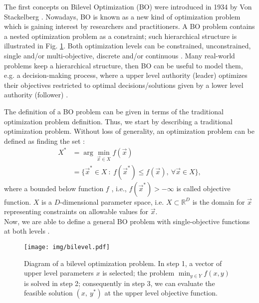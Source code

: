 \documentclass[conference]{IEEEtran}
\theoremstyle{definition}
\begin{document}
The first concepts on Bilevel Optimization (BO) were introduced in 1934 by Von
Stackelberg \cite{von2010market}. Nowadays, BO is known as a new kind of optimization
problem which is gaining interest by researchers and practitioners. A BO problem
contains a nested optimization problem as a constraint; such hierarchical structure
is illustrated in Fig. \ref{fig:bilevel}. Both optimization levels can be constrained,
unconstrained, single and/or multi-objective, discrete and/or continuous
\cite{bard2013practical,dempe2002foundations}. Many real-world problems keep a hierarchical
structure, then BO can be useful to model them, e.g. a decision-making process,
where a upper level authority (leader) optimizes their objectives restricted to
optimal decisions/solutions given by a  lower level authority (follower)
\cite{brotcorne2001bilevel,kalashnikov2010comparison,sinha2015transportation,von1945theory,wang2014bilevel}.

The definition of a BO problem can be given in terms of the traditional
optimization problem definition. Thus, we start by describing a traditional optimization
problem. Without loss of generality, an optimization problem can be defined as
finding the set \cite{chong2013introduction,rao2009engineering}:
% 
\begin{align}
    \label{eqn:Xargmin}
    X^* &= \arg \min_{\vec{x} \in X} f(\vec{x}) \\ \nonumber
    &= \{ \vec{x}^* \in X \ : \ f(\vec{x}^*) \leq f( \vec{x} ), \ 
    \forall
    \vec{x} \in X \},
\end{align}
% 
where a bounded below function $f$ , i.e., $f(\vec{x}^*)> -\infty$ is called objective
function. $X$ is a $D$-dimensional parameter space, i.e. $X \subset \mathbb{R}^D$
is the domain for $\vec{x}$ representing constraints on
allowable values for $\vec{x}$.\\

Now, we are able to define a general BO problem with
single-objective functions at both levels
\cite{bard2013practical,dempe2002foundations}.

\begin{figure}[!ht]
    \centering
    \texttt{[image: img/bilevel.pdf]}
    \caption{ Diagram of a bilevel optimization problem. In step 1, a vector of %
              upper level parameters $x$ is selected; the problem $\min_{y\in Y} %
              f(x, y)$ is solved in step 2; consequently in step 3, we can evaluate %
              the feasible solution $(x,\ y^*)$ at the upper level objective function. %
            }
    \label{fig:bilevel}
\end{figure}
% 
\end{document}
